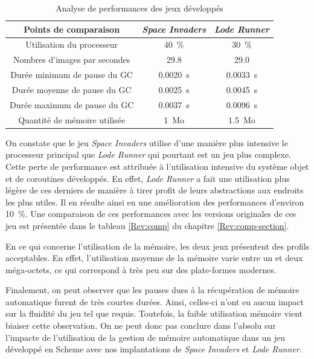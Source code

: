 \documentclass[12pt,twoside,letterpaper,francais]{book}
\newcommand{\customizedTableName}{\textsc{Tableau}}
\begin{document}
\renewcommand{\tablename}{\customizedTableName}
\begin{table}
  \center
  \begin{tabular}{ccc}
    \hline
    Points de comparaison & \textit{Space Invaders} & \textit{Lode Runner}\\
    \hline \hline
    Utilisation du processeur & 40~\% & 30~\%\\
    Nombres d'images par secondes & 29.8 & 29.0\\
    Durée minimum de pause du GC & 0.0020~s & 0.0033~s\\
    Durée moyenne de pause du GC & 0.0025~s & 0.0045~s\\
    Durée maximum de pause du GC & 0.0037~s & 0.0096~s\\
    Quantité de mémoire utilisée & 1~Mo& 1.5~Mo\\
    \hline
  \end{tabular}
  \caption{Analyse de performances des jeux développés}
  \label{Exp:perf}
\end{table}

On constate que le jeu \textit{Space Invaders} utilise d'une manière
plus intensive le processeur principal que \textit{Lode Runner} qui
pourtant est un jeu plus complexe. Cette perte de performance est
attribuée à l'utilisation intensive du système objet et de coroutines
développés. En effet, \textit{Lode Runner} a fait une utilisation plus
légère de ces derniers de manière à tirer profit de leurs abstractions
aux endroits les plus utiles. Il en résulte ainsi en une amélioration
des performances d'environ 10~\%. Une comparaison de ces performances
avec les versions originales de ces jeu est présentée dans le tableau
\ref{Rev:comp} du chapitre \ref{Rev:comp-section}.

En ce qui concerne l'utilisation de la mémoire, les deux jeux
présentent des profils acceptables. En effet, l'utilisation moyenne de
la mémoire varie entre un et deux méga-octets, ce qui correspond à
très peu sur des plate-formes modernes.

Finalement, on peut observer que les pauses dues à la récupération de
mémoire automatique furent de très courtes durées. Ainsi, celles-ci
n'ont eu aucun impact sur la fluidité du jeu tel que
requis. Toutefois, la faible utilisation mémoire vient biaiser cette
observation. On ne peut donc pas conclure dans l'absolu sur l'impacte
de l'utilisation de la gestion de mémoire automatique dans un jeu
développé en Scheme avec nos implantations de \textit{Space Invaders}
et \textit{Lode Runner}.
\end{document}
